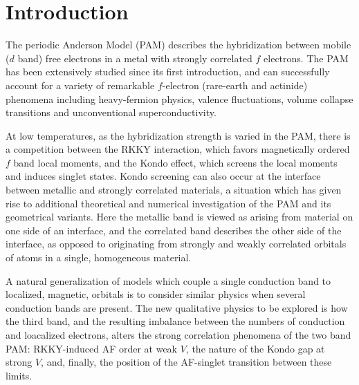 \documentclass[pra,letterpaper,10pt,twocolumn]{revtex4}
\begin{document}
\maketitle


\section{Introduction}
The periodic Anderson Model (PAM) describes the hybridization between
mobile ($d$ band) free electrons in a metal with  strongly correlated
$f$ electrons.  The PAM has been extensively studied since its first
introduction\cite{Anderson61}, and can successfully account for a variety
of remarkable $f$-electron (rare-earth and actinide) phenomena including
heavy-fermion
physics\cite{stewart84,lee86,Georges96,Vidhyadhiraja04,Sen16}, valence
fluctuations\cite{hewson93,Shinzaki16}, volume collapse
transitions\cite{allen82,allen92,lavagna83,gunnarsson83,mcmahan98,lipp08,bradley12,lanata15}
and unconventional superconductivity\cite{pixley15}. 

At low temperatures, as the hybridization strength is varied in the PAM,
there is a competition between the RKKY
interaction\cite{Ruderman54,Kasuya56,Yosida57}, which favors
magnetically ordered $f$ band local moments, and the Kondo
effect\cite{Kondo69, Kouwenhoven01}, which screens the local moments and
induces singlet states.  Kondo screening can also occur at the interface
between metallic and strongly correlated
materials\cite{mannhart05,mannhart10}, a situation which has given rise
to additional theoretical and numerical investigation of the PAM and its
geometrical variants\cite{millis05,freericks06,Euverte12}.  Here the
metallic band is viewed as arising from material on one side of an
interface, and the correlated band describes the other side of the
interface, as opposed to originating from strongly and weakly correlated
orbitals of atoms in a single, homogeneous material.

A natural generalization of models which couple a single conduction
band to localized, magnetic, orbitals is to consider similar physics
when several conduction bands are present.  The new qualitative
physics to be explored is how the third band, and the resulting
imbalance between the numbers of conduction and loacalized electrons,
alters the strong correlation phenomena of the two band PAM: 
RKKY-induced AF
order at weak $V$, the nature of the Kondo gap at strong $V$, and,
finally, the position of the AF-singlet transition between these limits.
\end{document}

